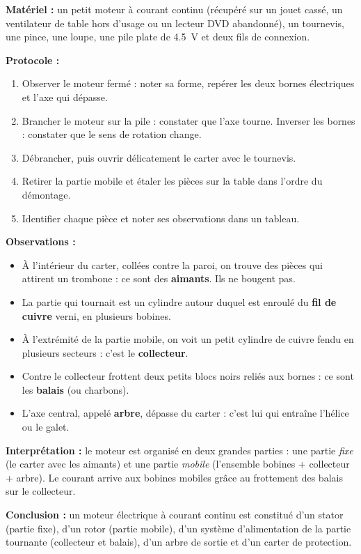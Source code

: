 \documentclass[11pt]{article}
\newcommand{\cle}[1]{{\popxbold\color{popdark}#1}}
\begin{document}
\begin{experience}
\textbf{Matériel :} un petit moteur à courant continu (récupéré sur un jouet cassé, un ventilateur de table hors d'usage ou un lecteur DVD abandonné), un tournevis, une pince, une loupe, une pile plate de \SI{4,5}{V} et deux fils de connexion.

\textbf{Protocole :}
\begin{enumerate}
\item Observer le moteur fermé : noter sa forme, repérer les deux bornes électriques et l'axe qui dépasse.
\item Brancher le moteur sur la pile : constater que l'axe tourne. Inverser les bornes : constater que le sens de rotation change.
\item Débrancher, puis ouvrir délicatement le carter avec le tournevis.
\item Retirer la partie mobile et étaler les pièces sur la table dans l'ordre du démontage.
\item Identifier chaque pièce et noter ses observations dans un tableau.
\end{enumerate}

\textbf{Observations :}
\begin{itemize}
\item À l'intérieur du carter, collées contre la paroi, on trouve des pièces qui attirent un trombone : ce sont des \textbf{aimants}. Ils ne bougent pas.
\item La partie qui tournait est un cylindre autour duquel est enroulé du \textbf{fil de cuivre} verni, en plusieurs bobines.
\item À l'extrémité de la partie mobile, on voit un petit cylindre de cuivre fendu en plusieurs secteurs : c'est le \textbf{collecteur}.
\item Contre le collecteur frottent deux petits blocs noirs reliés aux bornes : ce sont les \textbf{balais} (ou charbons).
\item L'axe central, appelé \textbf{arbre}, dépasse du carter : c'est lui qui entraîne l'hélice ou le galet.
\end{itemize}

\textbf{Interprétation :} le moteur est organisé en deux grandes parties : une partie \emph{fixe} (le carter avec les aimants) et une partie \emph{mobile} (l'ensemble bobines + collecteur + arbre). Le courant arrive aux bobines mobiles grâce au frottement des balais sur le collecteur.

\textbf{Conclusion :} un moteur électrique à courant continu est constitué d'un \cle{stator} (partie fixe), d'un \cle{rotor} (partie mobile), d'un système d'alimentation de la partie tournante (collecteur et balais), d'un arbre de sortie et d'un carter de protection.
\end{experience}
\end{document}
